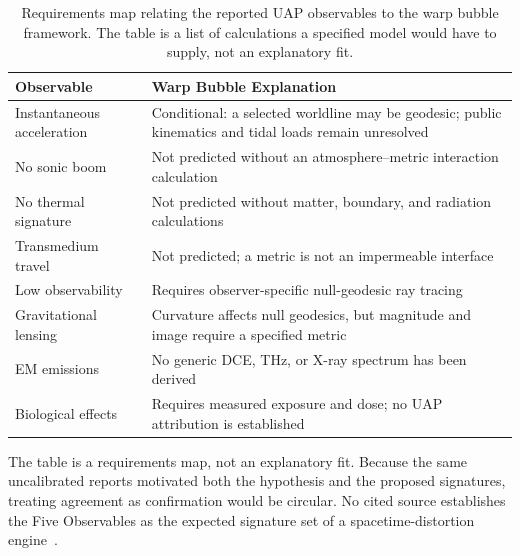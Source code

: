 \documentclass[aps,prd,twocolumn,superscriptaddress,nofootinbib,floatfix]{revtex4-2}
\begin{document}
\begin{table}[t]
\caption{Requirements map relating the reported UAP observables to the warp
bubble framework. The table is a list of calculations a specified model would have
to supply, not an explanatory fit.}
\label{tab:warp-observables}
\begin{tabular}{@{}ll@{}}
\toprule
\parbox[t]{0.27\textwidth}{\strut Observable\strut} & \parbox[t]{0.66\textwidth}{\strut Warp Bubble Explanation\strut} \\
\midrule
\parbox[t]{0.27\textwidth}{\strut Instantaneous acceleration\strut} & \parbox[t]{0.66\textwidth}{\strut Conditional: a selected worldline may be geodesic;
  public kinematics and tidal loads remain unresolved\strut} \\
\parbox[t]{0.27\textwidth}{\strut No sonic boom\strut} & \parbox[t]{0.66\textwidth}{\strut Not predicted without an atmosphere--metric interaction
  calculation\strut} \\
\parbox[t]{0.27\textwidth}{\strut No thermal signature\strut} & \parbox[t]{0.66\textwidth}{\strut Not predicted without matter, boundary, and radiation
  calculations\strut} \\
\parbox[t]{0.27\textwidth}{\strut Transmedium travel\strut} & \parbox[t]{0.66\textwidth}{\strut Not predicted; a metric is not an impermeable interface\strut} \\
\parbox[t]{0.27\textwidth}{\strut Low observability\strut} & \parbox[t]{0.66\textwidth}{\strut Requires observer-specific null-geodesic ray tracing\strut} \\
\parbox[t]{0.27\textwidth}{\strut Gravitational lensing\strut} & \parbox[t]{0.66\textwidth}{\strut Curvature affects null geodesics, but magnitude and image
  require a specified metric\strut} \\
\parbox[t]{0.27\textwidth}{\strut EM emissions\strut} & \parbox[t]{0.66\textwidth}{\strut No generic DCE, THz, or X-ray spectrum has been derived\strut} \\
\parbox[t]{0.27\textwidth}{\strut Biological effects\strut} & \parbox[t]{0.66\textwidth}{\strut Requires measured exposure and dose; no UAP attribution is
  established\strut} \\
\bottomrule
\end{tabular}
\end{table}

The table is a requirements map, not an explanatory fit. Because the same
uncalibrated reports motivated both the hypothesis and the proposed signatures,
treating agreement as confirmation would be circular. No cited source establishes
the Five Observables as the expected signature set of a spacetime-distortion
engine~\cite{Alcubierre1994,DIRD_Puthoff}.
\end{document}
